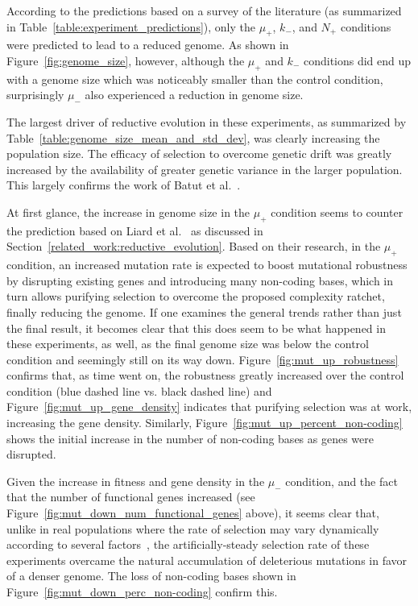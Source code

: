 According to the predictions based on a survey of the literature (as summarized in Table~\ref{table:experiment_predictions}), only the $\mu_+$, $k_-$, and $N_+$ conditions were predicted to lead to a reduced genome. As shown in Figure~\ref{fig:genome_size}, however, although the $\mu_+$ and $k_-$ conditions did end up with a genome size which was noticeably smaller than the control condition, surprisingly $\mu_-$ also experienced a reduction in genome size. 

The largest driver of reductive evolution in these experiments, as summarized by Table~\ref{table:genome_size_mean_and_std_dev}, was clearly increasing the population size. The efficacy of selection to overcome genetic drift was greatly increased by the availability of greater genetic variance in the larger population. This largely confirms the work of Batut et al.~\cite{Batut.2014}. 

At first glance, the increase in genome size in the $\mu_+$ condition seems to counter the prediction based on Liard et al.~\cite{Liard.2018} as discussed in Section~\ref{related_work:reductive_evolution}. Based on their research, in the $\mu_+$ condition, an increased mutation rate is expected to boost mutational robustness by disrupting existing genes and introducing many non-coding bases, which in turn allows purifying selection to overcome the proposed complexity ratchet, finally reducing the genome. If one examines the general trends rather than just the final result, it becomes clear that this does seem to be what happened in these experiments, as well, as the final genome size was below the control condition and seemingly still on its way down. Figure~\ref{fig:mut_up_robustness} confirms that, as time went on, the robustness greatly increased over the control condition (blue dashed line vs. black dashed line) and Figure~\ref{fig:mut_up_gene_density} indicates that purifying selection was at work, increasing the gene density. Similarly, Figure~\ref{fig:mut_up_percent_non-coding} shows the initial increase in the number of non-coding bases as genes were disrupted. 

Given the increase in fitness and gene density in the $\mu_-$ condition, and the fact that the number of functional genes increased (see Figure~\ref{fig:mut_down_num_functional_genes} above), it seems clear that, unlike in real populations where the rate of selection may vary dynamically according to several factors~\cite{lynch2016genetic}, the artificially-steady selection rate of these experiments overcame the natural accumulation of deleterious mutations in favor of a denser genome. The loss of non-coding bases shown in Figure~\ref{fig:mut_down_perc_non-coding} confirm this. 

